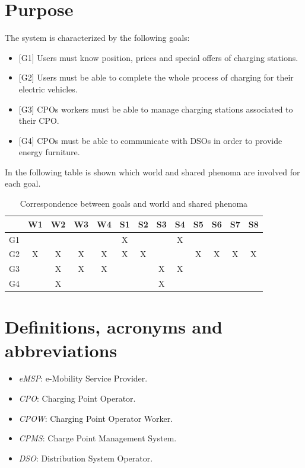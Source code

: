 \documentclass[a4paper]{report}
\begin{document}
\section{Purpose}
The system is characterized by the following goals:
\begin{itemize}
\item{[G1]} \label{G1}Users must know position, prices and special offers of charging stations.
\item {[G2]} \label{G2}Users must be able to complete the whole process of charging for their electric vehicles.
\item  {[G3]} \label{G3}CPOs workers must be able to manage charging stations associated to their CPO.
\item  {[G4]} \label{G4}CPOs must be able to communicate with DSOs in order to provide energy furniture.
\end{itemize}

In the following table is shown which world and shared phenoma are involved for each goal.
\begin{table}[H]
  \centering
  \begin{tabular}{|c|c|c|c|c|c|c|c|c|c|c|c|c|}
    \cline{2-13}
    \multicolumn{1}{c|}{} & W1 & W2 & W3 & W4 & S1 & S2 & S3 & S4 & S5 & S6 & S7 & S8\\ \hline
    G1 &   &   &   &   & X &   &   & X &   &   &   &   \\ \hline
    G2 & X & X & X & X & X & X &   &   & X & X & X & X \\ \hline
    G3 &   & X & X & X &   &   & X & X &   &   &   &   \\ \hline
    G4 &   & X &   &   &   &   & X &   &   &   &   &   \\ \hline
  \end{tabular}
  \caption{Correspondence between goals and world and shared phenoma}
\end{table}


\section{Definitions, acronyms and abbreviations}
\begin{itemize}
\item \textit{eMSP}: e-Mobility Service Provider.
\item \textit{CPO}: Charging Point Operator.
\item \textit{CPOW}: Charging Point Operator Worker.
\item \textit{CPMS}: Charge Point Management System.
\item \textit{DSO}: Distribution System Operator.
\end{itemize}
\end{document}
